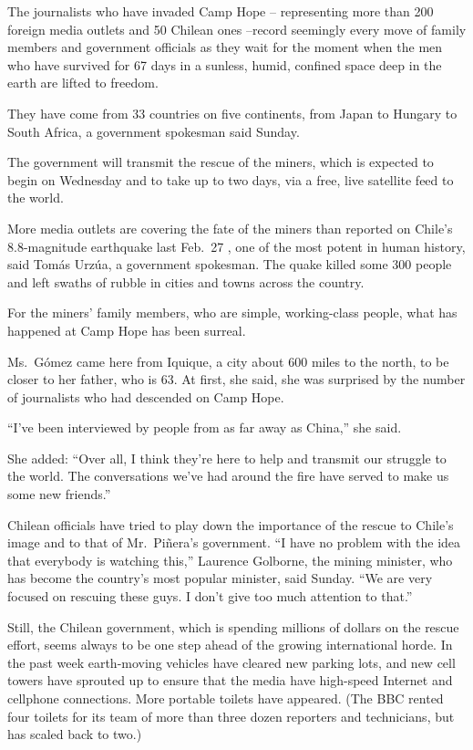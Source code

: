 ﻿\documentclass[12pt]{article}
\begin{document}
The journalists who have invaded Camp Hope -- representing more than 200 foreign media outlets and
50 Chilean ones --record seemingly every move of family members and government officials as they
wait for the moment when the men who have survived for 67 days in a sunless, humid, confined space
deep in the earth are lifted to freedom.

They have come from 33 countries on five continents, from Japan to Hungary to South Africa, a
government spokesman said Sunday.

The government will transmit the rescue of the miners, which is expected to begin on Wednesday and
to take up to two days, via a free, live satellite feed to the world.

More media outlets are covering the fate of the miners than reported on Chile's 8.8-magnitude
earthquake last Feb.~27 , one of the most potent in human history, said Tom\'as Urzúa, a government
spokesman. The quake killed some 300 people and left swaths of rubble in cities and towns across the
country.

For the miners' family members, who are simple, working-class people, what has happened at Camp Hope
has been surreal.

Ms.~G\'omez came here from Iquique, a city about 600 miles to the north, to be closer to her father,
who is 63. At first, she said, she was surprised by the number of journalists who had descended on
Camp Hope.

``I've been interviewed by people from as far away as China,'' she said.

She added: ``Over all, I think they're here to help and transmit our struggle to the world. The
conversations we've had around the fire have served to make us some new friends.''

Chilean officials have tried to play down the importance of the rescue to Chile's image and to that
of Mr.~Pi\~{n}era's government. ``I have no problem with the idea that everybody is watching this,''
Laurence Golborne, the mining minister, who has become the country's most popular minister, said
Sunday. ``We are very focused on rescuing these guys. I don't give too much attention to that.''

Still, the Chilean government, which is spending millions of dollars on the rescue effort, seems
always to be one step ahead of the growing international horde. In the past week earth-moving
vehicles have cleared new parking lots, and new cell towers have sprouted up to ensure that the
media have high-speed Internet and cellphone connections. More portable toilets have appeared. (The
BBC rented four toilets for its team of more than three dozen reporters and technicians, but has
scaled back to two.)
\end{document}
